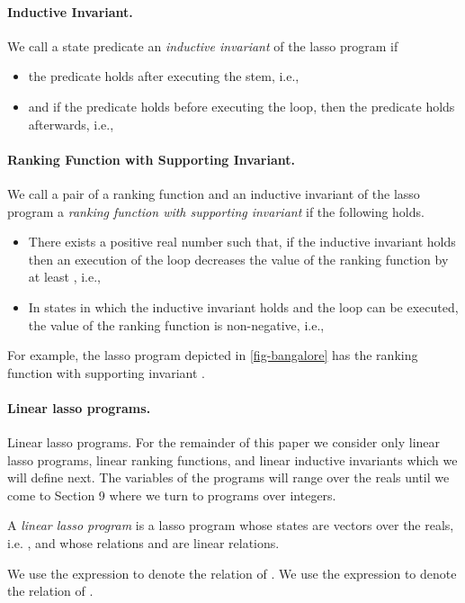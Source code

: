 \documentclass[a4paper]{llncs}
\newcommand{\defo}[1]{\emph{#1}}
\begin{document}
\paragraph{Inductive Invariant.}
We call a state predicate  an \defo{inductive invariant} of the lasso program  if

\begin{itemize}
\item the predicate holds after executing the stem, i.e.,



\item and if the predicate holds before executing the loop, then the predicate holds afterwards, i.e.,

\end{itemize}



\paragraph{Ranking Function with Supporting Invariant.}
We call a pair of a ranking function  and an inductive invariant  of the lasso program  a \emph{ranking function with supporting invariant} if the following holds.
\begin{itemize}
\item There exists a positive real number  such that, if the inductive invariant holds then an execution of the loop decreases the value of the ranking function by at least , i.e.,

\item In states in which the inductive invariant holds and the loop can be executed, the value of the ranking function is non-negative, i.e., 

\end{itemize}

For example, the lasso program depicted in \autoref{fig-bangalore} has the ranking function   with supporting invariant .

\paragraph{Linear lasso programs.}
Linear lasso programs. For the remainder of this paper we consider only linear lasso programs, linear ranking functions, and linear inductive invariants which we will define next.  The variables of the programs will range over the reals until we come to Section 9 where we turn to programs over integers.


\begin{definition}
A \defo{linear lasso program}  is a lasso program whose states are vectors over the reals, i.e. , and whose relations  and  are linear relations.
\end{definition}
We use the expression  to denote the relation  of .
We use the expression  to denote the relation  of .
\end{document}
